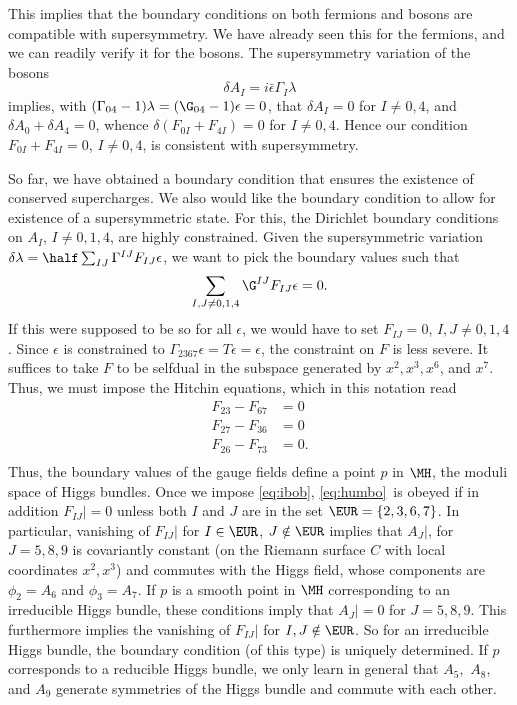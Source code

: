 This implies that the boundary conditions on both fermions and
bosons are compatible with supersymmetry. We have already seen
this for the fermions, and we can readily verify it for the
bosons.  The supersymmetry variation of the bosons
\setcounter{equation}{13}
\begin{equation}\label{eq:guffo}
\delta A_I=i\bar\epsilon\Gamma_I\lambda
\end{equation}
 implies, with
$(\Gamma_{04}-1)\lambda=(\G_{04}-1)\epsilon=0$, that $\delta
A_I=0$ for $I\not= 0,4$, and $\delta A_0+\delta A_4=0$, whence
$\delta(F_{0I}+F_{4I})=0$ for $I\not=0,4$.  Hence our condition
$F_{0I}+F_{4I}=0$, $I\not= 0,4$, is consistent with supersymmetry.

So far, we have obtained a boundary condition that ensures the
existence of conserved supercharges.  We also would like the
boundary condition to allow for existence of a supersymmetric
state.  For this, the Dirichlet boundary conditions on $A_I$,
$I\not=0,1,4$, are highly constrained.  Given the supersymmetric
variation $\delta \lambda= \half
\sum_{IJ}\Gamma^{IJ}F_{IJ}\epsilon$, we want to pick the boundary
values such that %
\setcounter{equation}{14}
\begin{equation}\label{eq:humbo}
\sum_{I,J\not=
0,1,4}\G^{IJ}F_{IJ}\epsilon=0.
\end{equation}
 If this were supposed to be so for
all $\epsilon$, we would have to set $F_{IJ}=0$, $I,J\not= 0,1,4$.
Since $\epsilon$ is constrained to
$\Gamma_{2367}\epsilon=T\epsilon=\epsilon$, the constraint on $F$
is less severe.  It suffices to take $F$ to be selfdual in the
subspace generated by $x^2,x^3,x^6$, and $x^7$. Thus, we must
impose the Hitchin equations, which in this notation read
\setcounter{equation}{15}
\begin{equation}\label{eq:ibob}
\begin{aligned}F_{23}-F_{67}& =0\\ F_{27}-F_{36}& = 0 \\
 F_{26}-F_{73}& = 0 . \\\end{aligned}
\end{equation}
  Thus, the boundary values of the gauge fields
define a point $p$ in $\MH$, the moduli space of Higgs bundles.
Once we impose \eqref{eq:ibob}, \eqref{eq:humbo}\ is obeyed if in addition $F_{IJ}|=0$
unless both $I$ and $J$ are in the set ${\EUR}=\{2,3,6,7\}$. In
particular, vanishing of $F_{IJ}|$ for $I\in {\EUR}$, $J\notin
{\EUR}$ implies that $A_J|$, for $J=5,8,9$ is covariantly constant
(on the Riemann surface $C$ with local coordinates $x^2,x^3$) and
commutes with the Higgs field, whose components are $\phi_2=A_6 $
and $\phi_3=A_7$.   If $p$ is a smooth point in $\MH$
corresponding to an irreducible Higgs bundle, these conditions
imply that $A_J|=0$ for $J=5,8,9$.  This furthermore implies the
vanishing of $F_{IJ}|$ for $I,J\notin {\EUR}$. So for an
irreducible Higgs bundle, the boundary condition (of this type) is
uniquely determined.  If $p$ corresponds to a reducible Higgs
bundle, we only learn in general that $A_5,$ $A_8$, and $A_9$
generate symmetries of the Higgs bundle and commute with each
other.

